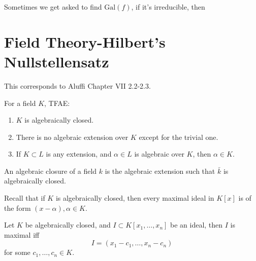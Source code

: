 \documentclass[openany]{book}
\newcommand{\gal}{\text{Gal}}
\begin{document}
\begin{warn}
    Sometimes we get asked to find $\gal(f)$, if it's irreducible, then 
\end{warn}























































\chapter{Field Theory-Hilbert's Nullstellensatz}
This corresponds to Aluffi Chapter VII 2.2-2.3.


\begin{prop}
    For a field $K$, TFAE:
    \begin{enumerate}
        \item $K$ is algebraically closed.
        \item There is no algebraic extension over $K$ except for the trivial one.
        \item If $K\subset L$ is any extension, and $\alpha\in L$ is algebraic over $K$, then $\alpha\in K$.
    \end{enumerate}
\end{prop}

\begin{defn}
    An algebraic closure of a field $k$ is the algebraic extension such that $\bar{k}$ is algebraically closed.
\end{defn}

\begin{prop}
    Recall that if $K$ is algebraically closed, then every maximal ideal in $K[x]$ is of the form $(x-\alpha),\alpha\in K$.
\end{prop}
\begin{prop}
    Let $K$ be algebraically closed, and $I\subset K[x_1,\dots,x_n]$ be an ideal, then $I$ is maximal iff 
    \begin{equation*}
        I=(x_1-c_1,\dots, x_n-c_n)
    \end{equation*}
    for some $c_1,\dots,c_n\in K$.
\end{prop}
\end{document}
